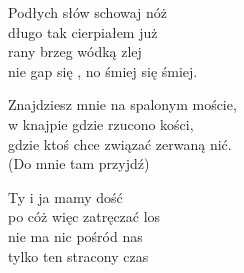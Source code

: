 \begin{text}
    Podłych słów schowaj nóż\\
    długo tak cierpiałem już\\
    rany brzeg wódką zlej\\
    nie gap się , no śmiej się śmiej.

    \vin Znajdziesz mnie na spalonym moście,\\
    \vin w knajpie gdzie rzucono kości,\\
    \vin gdzie ktoś chce związać zerwaną nić.\\
    \vin (Do mnie tam przyjdź)

    Ty i ja mamy dość\\
    po cóż więc zatręczać los\\
    nie ma nic pośród nas\\
    tylko ten stracony czas
\end{text}
\begin{chord}

\end{chord}
